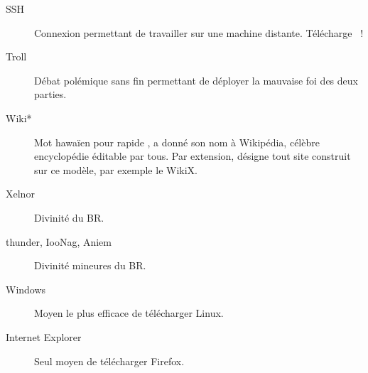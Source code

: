 \begin{description}
  \item[SSH] Connexion permettant de travailler sur une machine distante. Télécharge ~!

  \item[Troll] Débat polémique sans fin permettant de déployer la mauvaise foi des deux parties.



  \item[Wiki*] Mot hawa\"ien pour \og rapide \fg, a donné son nom à Wikipédia, célèbre encyclopédie éditable par tous.
  Par extension, désigne tout site construit sur ce modèle, par exemple le WikiX.%

  \item[Xelnor] Divinité du BR.

  \item[thunder, IooNag, Aniem] Divinité mineures du BR.

  \item[Windows] Moyen le plus efficace de télécharger Linux.

  \item[Internet Explorer] Seul moyen de télécharger Firefox.

\end{description}
